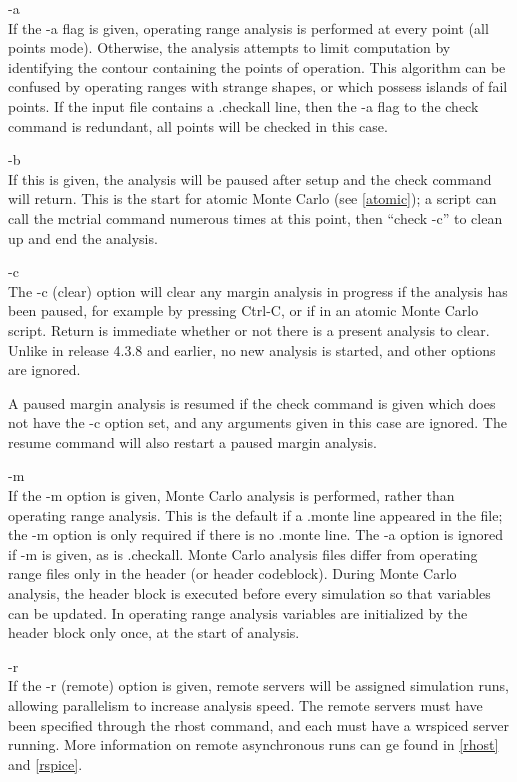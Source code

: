 \begin{description}
\item{\vt -a}\\
If the {\vt -a} flag is given, operating range analysis is performed
at every point (all points mode).  Otherwise, the analysis attempts to
limit computation by identifying the contour containing the points of
operation.  This algorithm can be confused by operating ranges with
strange shapes, or which possess islands of fail points.  If the input
file contains a {\vt .checkall} line, then the {\vt -a} flag to the
{\cb check} command is redundant, all points will be checked in this
case.

\item{\vt -b}\\
If this is given, the analysis will be paused after setup and the {\cb
check} command will return.  This is the start for atomic Monte Carlo
(see \ref{atomic}); a script can call the {\cb mctrial} command
numerous times at this point, then ``{\vt check -c}'' to clean up and
end the analysis.

\item{\vt -c}\\
The {\vt -c} (clear) option will clear any margin analysis in progress
if the analysis has been paused, for example by pressing {\kb Ctrl-C},
or if in an atomic Monte Carlo script.  Return is immediate whether or
not there is a present analysis to clear.  Unlike in release 4.3.8 and
earlier, no new analysis is started, and other options are ignored.

A paused margin analysis is resumed if the {\cb check} command is
given which does not have the {\vt -c} option set, and any arguments
given in this case are ignored.  The {\cb resume} command will also
restart a paused margin analysis.

\item{\vt -m}\\
If the {\vt -m} option is given, Monte Carlo analysis is performed,
rather than operating range analysis.  This is the default if a {\vt
.monte} line appeared in the file; the {\vt -m} option is only
required if there is no {\vt .monte} line.  The {\vt -a} option is
ignored if {\vt -m} is given, as is {\vt .checkall}.  Monte Carlo
analysis files differ from operating range files only in the header
(or header codeblock).  During Monte Carlo analysis, the header block
is executed before every simulation so that variables can be updated. 
In operating range analysis variables are initialized by the header
block only once, at the start of analysis.

\item{\vt -r}\\
If the {\vt -r} (remote) option is given, remote servers will be
assigned simulation runs, allowing parallelism to increase analysis
speed.  The remote servers must have been specified through the {\cb
rhost} command, and each must have a {\vt wrspiced} server running. 
More information on remote asynchronous runs can ge found in
\ref{rhost} and \ref{rspice}.
\end{description}

